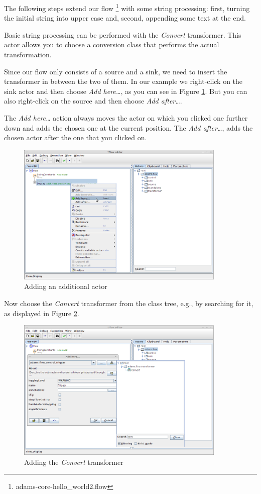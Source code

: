 The following steps extend our flow \footnote{adams-core-hello\_world2.flow}
with some string processing: first, turning the initial string into upper case
and, second, appending some text at the
end.

Basic string processing can be performed with the \textit{Convert} transformer.
This actor allows you to choose a conversion class that performs the actual
transformation.

Since our flow only consists of a source and a sink, we need to insert the
transformer in between the two of them. In our example we right-click on the
sink actor and then choose \textit{Add here\ldots}, as you can see in Figure
\ref{floweditor-helloworld-processdata1}. But you can also right-click on the
source and then choose \textit{Add after\ldots}.

The \textit{Add here\ldots} action always moves the actor on which you clicked
one further down and adds the chosen one at the current position. The
\textit{Add after\ldots}, adds the chosen actor after the one that you clicked
on.

\begin{figure}[htb]
  \centering
  \includegraphics[width=10.0cm]{images/floweditor-helloworld-processdata1.png}
  \caption{Adding an additional actor}
  \label{floweditor-helloworld-processdata1}
\end{figure}

Now choose the \textit{Convert} transformer from the class tree, e.g., by
searching for it, as displayed in Figure
\ref{floweditor-helloworld-processdata2}.

\begin{figure}[htb]
  \centering
  \includegraphics[width=10.0cm]{images/floweditor-helloworld-processdata2.png}
  \caption{Adding the \textit{Convert} transformer}
  \label{floweditor-helloworld-processdata2}
\end{figure}

